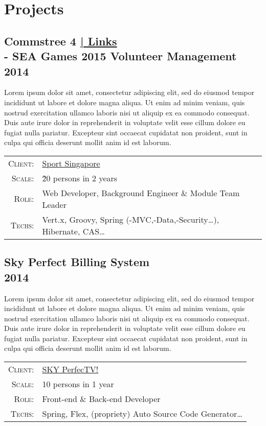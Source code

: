 \documentclass[a4paper,10pt]{article}
\begin{document}
\section{Projects}

\subsection*{Commstree 4 \hfill \footnotesize {\hyperlink{ct-links}{| Links}}\\\large - SEA Games 2015 Volunteer Management\\\small 2014}

Lorem ipsum dolor sit amet, consectetur adipiscing elit, sed do eiusmod tempor incididunt ut labore et dolore magna aliqua. Ut enim ad minim veniam, quis nostrud exercitation ullamco laboris nisi ut aliquip ex ea commodo consequat. Duis aute irure dolor in reprehenderit in voluptate velit esse cillum dolore eu fugiat nulla pariatur. Excepteur sint occaecat cupidatat non proident, sunt in culpa qui officia deserunt mollit anim id est laborum.

\begin{tabular}{rl}
    \textsc{Client:} & \href{http://www.sportsingapore.gov.sg/}{Sport Singapore}\\
    \textsc{Scale:} & \~20 persons in 2 years\\
    \textsc{Role:} & Web Developer, Background Engineer \& Module Team Leader\\
    \textsc{Techs:} & Vert.x, Groovy, Spring (-MVC,-Data,-Security\ldots), Hibernate, CAS\ldots\\
\end{tabular}


\subsection*{Sky Perfect Billing System\\\small 2014}

Lorem ipsum dolor sit amet, consectetur adipiscing elit, sed do eiusmod tempor incididunt ut labore et dolore magna aliqua. Ut enim ad minim veniam, quis nostrud exercitation ullamco laboris nisi ut aliquip ex ea commodo consequat. Duis aute irure dolor in reprehenderit in voluptate velit esse cillum dolore eu fugiat nulla pariatur. Excepteur sint occaecat cupidatat non proident, sunt in culpa qui officia deserunt mollit anim id est laborum.

\begin{tabular}{rl}
    \textsc{Client:} & \href{https://www.skyperfectv.co.jp/eng/}{SKY PerfecTV!}\\
    \textsc{Scale:} & 10 persons in 1 year\\
    \textsc{Role:} & Front-end \& Back-end Developer\\
    \textsc{Techs:} & Spring, Flex, (propriety) Auto Source Code Generator\ldots\\
\end{tabular}
\end{document}
